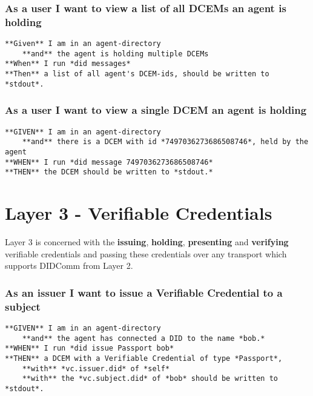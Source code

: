 \hypertarget{as-a-user-i-want-to-view-a-list-of-all-dcems-an-agent-is-holding}{%
\subsubsection{As a user I want to view a list of all DCEMs an agent is
holding}\label{as-a-user-i-want-to-view-a-list-of-all-dcems-an-agent-is-holding}}

\begin{lstlisting}
**Given** I am in an agent-directory
    **and** the agent is holding multiple DCEMs
**When** I run *did messages*
**Then** a list of all agent's DCEM-ids, should be written to *stdout*.
\end{lstlisting}

\hypertarget{as-a-user-i-want-to-view-a-single-dcem-an-agent-is-holding}{%
\subsubsection{As a user I want to view a single DCEM an agent is
holding}\label{as-a-user-i-want-to-view-a-single-dcem-an-agent-is-holding}}

\begin{lstlisting}
**GIVEN** I am in an agent-directory
    **and** there is a DCEM with id *7497036273686508746*, held by the agent
**WHEN** I run *did message 7497036273686508746*
**THEN** the DCEM should be written to *stdout.*
\end{lstlisting}

\hypertarget{layer-3---verifiable-credentials}{%
\section{Layer 3 - Verifiable
Credentials}\label{layer-3---verifiable-credentials}}

Layer 3 is concerned with the \textbf{issuing}, \textbf{holding},
\textbf{presenting} and \textbf{verifying} verifiable credentials and
passing these credentials over any transport which supports DIDComm from
Layer 2.

\hypertarget{as-an-issuer-i-want-to-issue-a-verifiable-credential-to-a-subject}{%
\subsubsection{As an issuer I want to issue a Verifiable Credential to a
subject}\label{as-an-issuer-i-want-to-issue-a-verifiable-credential-to-a-subject}}

\begin{lstlisting}
**GIVEN** I am in an agent-directory
    **and** the agent has connected a DID to the name *bob.*
**WHEN** I run *did issue Passport bob*
**THEN** a DCEM with a Verifiable Credential of type *Passport*, 
    **with** *vc.issuer.did* of *self*
    **with** the *vc.subject.did* of *bob* should be written to *stdout*.
\end{lstlisting}

